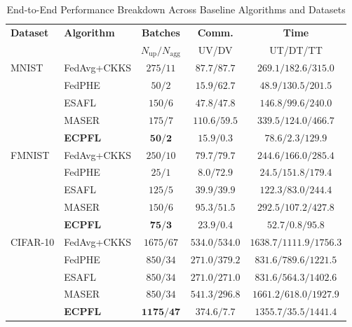 \begin{table}[t]
\centering
\caption{End-to-End Performance Breakdown Across Baseline Algorithms and Datasets}
\label{tab:perf_evaluation}
\scriptsize
\setlength{\tabcolsep}{0.8pt}
\begin{tabular}{@{}llccc@{}}
\toprule
\textbf{Dataset} & \textbf{Algorithm} & \textbf{Batches} & \textbf{Comm.} & \textbf{Time} \\
& & \scriptsize $N_{\mathrm{up}}/N_{\mathrm{agg}}$ & \scriptsize UV/DV & \scriptsize UT/DT/TT \\
\midrule

MNIST & FedAvg+CKKS & $275/11$ & $87.7/87.7$ & $269.1/182.6/315.0$ \\
& FedPHE      & $50/2$   & $15.9/62.7$ & $48.9/130.5/201.5$ \\
& ESAFL       & $150/6$ & $47.8/47.8$ & $146.8/99.6/240.0$ \\
& MASER       & $175/7$ & $110.6/59.5$ & $339.5/124.0/466.7$ \\
\rowcolor{gray!15}
& \textbf{ECPFL} & $\mathbf{50}/\mathbf{2}$ & $\mathbf{15.9}/\mathbf{0.3}$ & $\mathbf{78.6}/\mathbf{2.3}/\mathbf{129.9}$ \\
\midrule

FMNIST & FedAvg+CKKS & $250/10$ & $79.7/79.7$ & $244.6/166.0/285.4$ \\
& FedPHE      & $25/1$   & $8.0/72.9$  & $24.5/151.8/179.4$ \\
& ESAFL       & $125/5$ & $39.9/39.9$ & $122.3/83.0/244.4$ \\
& MASER       & $150/6$ & $95.3/51.5$ & $292.5/107.2/427.8$ \\
\rowcolor{gray!15}
& \textbf{ECPFL} & $\mathbf{75}/\mathbf{3}$ & $\mathbf{23.9}/\mathbf{0.4}$ & $\mathbf{52.7}/\mathbf{0.8}/\mathbf{95.8}$ \\
\midrule

CIFAR-10 & FedAvg+CKKS & $1675/67$ & $534.0/534.0$ & $1638.7/1111.9/1756.3$ \\
& FedPHE      & $850/34$   & $271.0/379.2$ & $831.6/789.6/1221.5$ \\
& ESAFL       & $850/34$   & $271.0/271.0$ & $831.6/564.3/1402.6$ \\
& MASER       & $850/34$   & $541.3/296.8$ & $1661.2/618.0/1927.9$ \\
\rowcolor{gray!15}
& \textbf{ECPFL} & $\mathbf{1175}/\mathbf{47}$ & $\mathbf{374.6}/\mathbf{7.7}$ & $\mathbf{1355.7}/\mathbf{35.5}/\mathbf{1441.4}$ \\
\midrule


\end{tabular}
\end{table}
